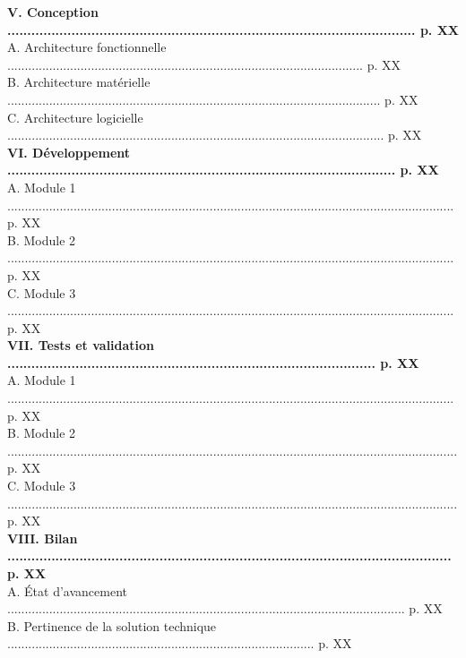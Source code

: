 \documentclass[a4paper,11pt]{book}
\begin{document}
\begin{tabbing}
\textbf{{V. Conception ...................................................................................................... p. XX}}\\
A. Architecture fonctionnelle ...................................................................................................... p. XX\\
B. Architecture matérielle ........................................................................................................... p. XX\\
C. Architecture logicielle ............................................................................................................ p. XX\\
\textbf{{VI. Développement ................................................................................................. p. XX}}\\
A. Module 1 ................................................................................................................................ p. XX\\
B. Module 2 ................................................................................................................................ p. XX\\
C. Module 3 ................................................................................................................................ p. XX\\
\textbf{{VII. Tests et validation ............................................................................................ p. XX}}\\
A. Module 1 ................................................................................................................................ p. XX\\
B. Module 2 ................................................................................................................................. p. XX\\
C. Module 3 ................................................................................................................................. p. XX\\
\textbf{{VIII. Bilan ............................................................................................................... p. XX}}\\
A. État d'avancement .................................................................................................................. p. XX\\
B. Pertinence de la solution technique ........................................................................................ p. XX\\

\end{tabbing}
\end{document}
